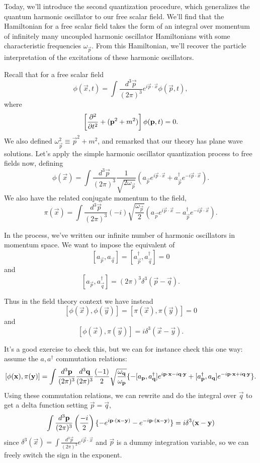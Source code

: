 Today, we'll introduce the second quantization procedure, which generalizes the quantum harmonic oscillator to our free scalar field. We'll find that the Hamiltonian for a free scalar field takes the form of an integral over momentum of infinitely many uncoupled harmonic oscillator Hamiltonians with some characteristic frequencies $\omega_{\vec p}$. From this Hamiltonian, we'll recover the particle interpretation of the excitations of these harmonic oscillators.

Recall that for a free scalar field $$\phi(\vec{x},t)=\int \frac{d^3 \vec{p}}{(2\pi)^3} e^{i \vec{p}\cdot \vec{x}}\phi(\vec{p},t),$$ where
$$\left[\P[2]{}{t}+(\vec{p}^2 +m^2)\right]\phi(\vec{p},t)=0.$$
We also defined $\omega_{\vec{p}}^2\equiv \vec{p}^2 +m^2$, and remarked that our theory has plane wave solutions. 
Let's apply the simple harmonic oscillator quantization process to free fields now, defining
$$\phi(\vec{x})=\int \frac{d^3 \vec{p}}{(2\pi)^3}\frac{1}{\sqrt{2\omega_{\vec p}}}(a_{\vec p}e^{i\vec{p} \cdot \vec x}+a^\dagger_{\vec p}e^{-i\vec{p} \cdot \vec x}).$$
We also have the related conjugate momentum to the field,
$$\pi(\vec{x})=\int \frac{d^3 \vec{p}}{(2\pi)^3}(-i)\sqrt{\frac{\omega_{\vec p}}{2}}(a_{\vec p}e^{i\vec{p} \cdot \vec x}-a^\dagger_{\vec p}e^{-i\vec{p} \cdot \vec x}).$$

In the  process, we've written our infinite number of harmonic oscillators in momentum space. We want to impose the equivalent of $$[a_{\vec p},a_{\vec q}]=[a^\dagger_{\vec p}, a^\dagger_{\vec q}]=0$$ and $$[a_{\vec p}, a_{\vec q}^\dagger]=(2\pi)^3 \delta^3(\vec p -\vec q).$$

Thus in the field theory context we have instead
$$[\phi(\vec x), \phi(\vec y)]= [\pi (\vec x), \pi (\vec y)]=0$$
and
$$[\phi(\vec x), \pi (\vec y)]=i\delta^3 (\vec x - \vec y).$$

It's a good exercise to check this, but we can for instance check this one way: assume the $a, a^\dagger$ commutation relations:
$$[\phi(\vec x),\pi(\vec y)]=\int \frac{d^3 \vec p}{(2\pi)^3} \frac{d^3 \vec q}{(2\pi)^3} \frac{(-1)}{2}\sqrt{\frac{\omega_{\vec q}}{\omega_{\vec p}}}\set{ -[a_{\vec p}, a_{\vec q}^\dagger] e^{i\vec p \cdot \vec x - i\vec q \cdot \vec y}+[a_{\vec p}^\dagger, a_{\vec q}] e^{-i\vec p \cdot \vec x + i\vec q \cdot \vec y}}.$$
Using these commutation relations, we can rewrite and do the integral over $\vec q$ to get a delta function setting $\vec p = \vec q$,
$$\int \frac{d^3 \vec p}{(2\pi)^3}\left(\frac{-i}{2}\right)\set{-e^{i\vec p \cdot (\vec x - \vec y)}-e^{-i\vec p \cdot (\vec x - \vec y)}}=i \delta^3 (\vec x - \vec y)$$
since $\delta^3(\vec x)= \int \frac{d^3 \vec p}{(2\pi)^3} e^{i \vec p \cdot \vec x}$ and $\vec p$ is a dummy integration variable, so we can freely switch the sign in the exponent.

